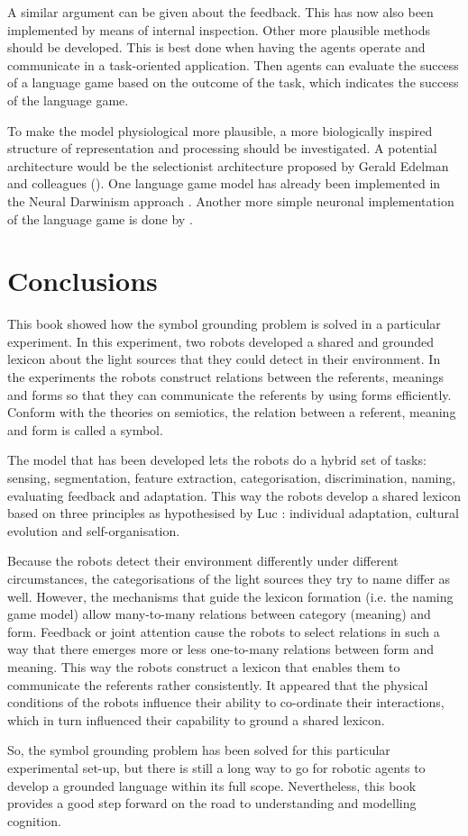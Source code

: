 \enlargethispage{1\baselineskip}
A similar argument can be given about the feedback. This has now also been implemented by means of internal inspection. Other more plausible methods should be developed. This is best done when having the agents operate and communicate in a task-oriented application. Then agents can evaluate the success of a language game based on the outcome of the task, which indicates the success of the language game. 


To make the model physiological more plausible, a more biologically inspired structure of representation and processing should be investigated. A potential architecture would be the selectionist architecture proposed by Gerald Edelman and colleagues (\citeyear{edelman:1987}). One language game model has already been implemented in the Neural Darwinism approach \citep{popescu-belis:1997}. Another more simple neuronal implementation of the language game is done by \citet{dircksstoness:1999}.

\section{Conclusions}

This book showed how the symbol grounding problem is solved in a particular experiment. In this experiment, two robots developed a shared and grounded lexicon about the light sources that they could detect in their environment. In the experiments the robots construct relations between the referents, meanings and forms so that they can communicate the referents by using forms efficiently. Conform with the theories on semiotics, the relation between a referent, meaning and form is called a symbol.

The model that has been developed lets the robots do a hybrid set of tasks: sensing, segmentation, feature extraction, categorisation, discrimination, naming, evaluating feedback and adaptation. This way the robots develop a shared lexicon based on three principles as hypothesised by Luc \citet{steels:1996a}: individual adaptation, cultural evolution and self-organisation. 

Because the robots detect their environment differently under different circumstances, the categorisations of the light sources they try to name differ as well. However, the mechanisms that guide the lexicon formation (i.e. the naming game model) allow many-to-many relations between category (meaning) and form. Feedback or joint attention cause the robots to select relations in such a way that there emerges more or less one-to-many relations between form and meaning. This way the robots construct a lexicon that enables them to communicate the referents rather consistently. It appeared that the physical conditions of the robots influence their ability to co-ordinate their interactions, which in turn influenced their capability to ground a shared lexicon.

\enlargethispage{1\baselineskip}
So, the symbol grounding problem has been solved for this particular experimental set-up, but there is still a long way to go for robotic agents to develop a grounded language within its full scope. Nevertheless, this book provides a good step forward on the road to understanding and modelling cognition.